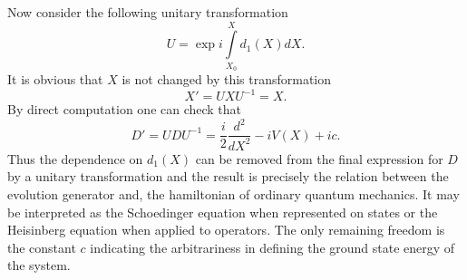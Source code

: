 \documentclass[a4paper,11pt]{article}
\begin{document}
Now consider the following unitary transformation
\begin{equation}
U=\exp{i \int\limits_{X_0}^{X} d_1(X)dX}. \label{untr}
\end{equation}
It is obvious that $X$ is not changed by this transformation
\begin{equation}
X'=UXU^{-1}=X.
\end{equation}
By direct computation one can check that
\begin{equation}
D'=UDU^{-1}=\frac{i}{2}\frac{d^2}{dX^2}- i V(X)+ic. \label{sgeq1}
\end{equation}
Thus the dependence on $d_1(X)$ can be removed from the final
expression for $D$ by a unitary transformation and the result is
precisely the relation between the evolution generator and, the
hamiltonian of ordinary quantum mechanics. It may be interpreted
as the Schoedinger equation when represented on states or the
Heisinberg equation when applied to operators. The only remaining
freedom is the constant $c$ indicating the arbitrariness in
defining the ground state energy of the system.
\end{document}
